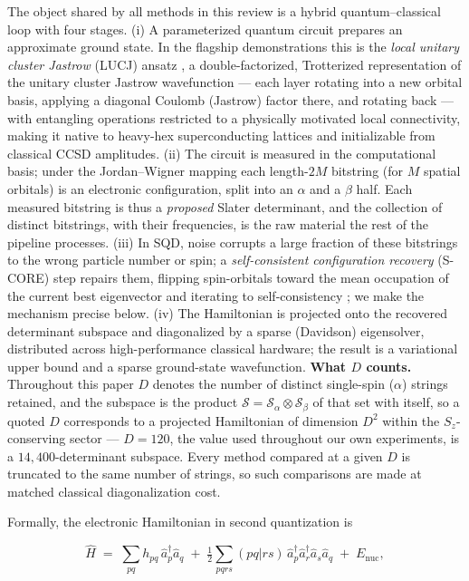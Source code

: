 \documentclass[onecolumn,a4paper]{quantumarticle}
\begin{document}
The object shared by all methods in this review is a hybrid quantum--classical loop with four stages. (i) A parameterized quantum circuit prepares an approximate ground state. In the flagship demonstrations this is the \emph{local unitary cluster Jastrow} (LUCJ) ansatz \cite{motta2023}, a double-factorized, Trotterized representation of the unitary cluster Jastrow wavefunction --- each layer rotating into a new orbital basis, applying a diagonal Coulomb (Jastrow) factor there, and rotating back --- with entangling operations restricted to a physically motivated local connectivity, making it native to heavy-hex superconducting lattices and initializable from classical CCSD amplitudes. (ii) The circuit is measured in the computational basis; under the Jordan--Wigner mapping each length-$2M$ bitstring (for $M$ spatial orbitals) is an electronic configuration, split into an $\alpha$ and a $\beta$ half. Each measured bitstring is thus a \emph{proposed} Slater determinant, and the collection of distinct bitstrings, with their frequencies, is the raw material the rest of the pipeline processes. (iii) In SQD, noise corrupts a large fraction of these bitstrings to the wrong particle number or spin; a \emph{self-consistent configuration recovery} (S-CORE) step repairs them, flipping spin-orbitals toward the mean occupation of the current best eigenvector and iterating to self-consistency \cite{robledomoreno2025}; we make the mechanism precise below. (iv) The Hamiltonian is projected onto the recovered determinant subspace and diagonalized by a sparse (Davidson) eigensolver, distributed across high-performance classical hardware; the result is a variational upper bound and a sparse ground-state wavefunction. \textbf{What $D$ counts.} Throughout this paper $D$ denotes the number of distinct single-spin ($\alpha$) strings retained, and the subspace is the product $\mathcal{S}=\mathcal{S}_\alpha\otimes\mathcal{S}_\beta$ of that set with itself, so a quoted $D$ corresponds to a projected Hamiltonian of dimension $D^2$ within the $S_z$-conserving sector --- $D{=}120$, the value used throughout our own experiments, is a $14{,}400$-determinant subspace. Every method compared at a given $D$ is truncated to the same number of strings, so such comparisons are made at matched classical diagonalization cost.

Formally, the electronic Hamiltonian in second quantization is

\begin{equation}
\hat H \;=\; \sum_{pq} h_{pq}\, \hat a_p^{\dagger}\hat a_q \;+\; \tfrac{1}{2}\!\sum_{pqrs} (pq|rs)\, \hat a_p^{\dagger}\hat a_r^{\dagger}\hat a_s\hat a_q \;+\; E_{\mathrm{nuc}},
\end{equation}
\end{document}
